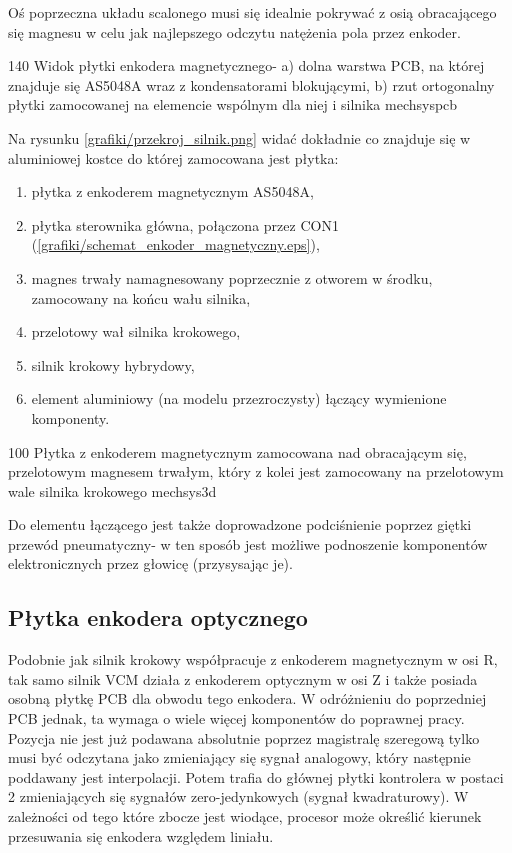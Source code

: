 Oś poprzeczna układu scalonego musi się idealnie pokrywać z osią obracającego się magnesu w celu jak najlepszego odczytu natężenia pola przez enkoder.

	{140}
	{Widok płytki enkodera magnetycznego- a) dolna warstwa PCB, na której znajduje się AS5048A wraz z kondensatorami blokującymi, b) rzut ortogonalny płytki zamocowanej na elemencie wspólnym dla niej i silnika}
	{mechsyspcb}
	
Na rysunku \ref{grafiki/przekroj_silnik.png} widać dokładnie co znajduje się w aluminiowej kostce do której zamocowana jest płytka:

\begin{enumerate}
	\item płytka z enkoderem magnetycznym AS5048A,
	\item płytka sterownika główna, połączona przez CON1 (\ref{grafiki/schemat_enkoder_magnetyczny.eps}),
	\item magnes trwały namagnesowany poprzecznie z otworem w środku, zamocowany na końcu wału silnika,
	\item przelotowy wał silnika krokowego,
	\item silnik krokowy hybrydowy,
	\item element aluminiowy (na modelu przezroczysty) łączący wymienione komponenty.
\end{enumerate}
	
	{100}
	{Płytka z enkoderem magnetycznym zamocowana nad obracającym się, przelotowym magnesem trwałym, który z kolei jest zamocowany na przelotowym wale silnika krokowego}
	{mechsys3d}
	
Do elementu łączącego jest także doprowadzone podciśnienie poprzez giętki przewód pneumatyczny- w ten sposób jest możliwe podnoszenie komponentów elektronicznych przez głowicę (przysysając je).
	
\subsection{Płytka enkodera optycznego}
\label{ss:encmag}

Podobnie jak silnik krokowy współpracuje z enkoderem magnetycznym w osi R, tak samo silnik VCM działa z enkoderem optycznym w osi Z i także posiada osobną płytkę PCB dla obwodu tego enkodera. W odróżnieniu do poprzedniej PCB jednak, ta wymaga o wiele więcej komponentów do poprawnej pracy. Pozycja nie jest już podawana absolutnie poprzez magistralę szeregową tylko musi być odczytana jako zmieniający się sygnał analogowy, który następnie poddawany jest interpolacji. Potem trafia do głównej płytki kontrolera w postaci 2 zmieniających się sygnałów zero-jedynkowych (sygnał kwadraturowy). W zależności od tego które zbocze jest wiodące, procesor może określić kierunek przesuwania się enkodera względem liniału. \\

